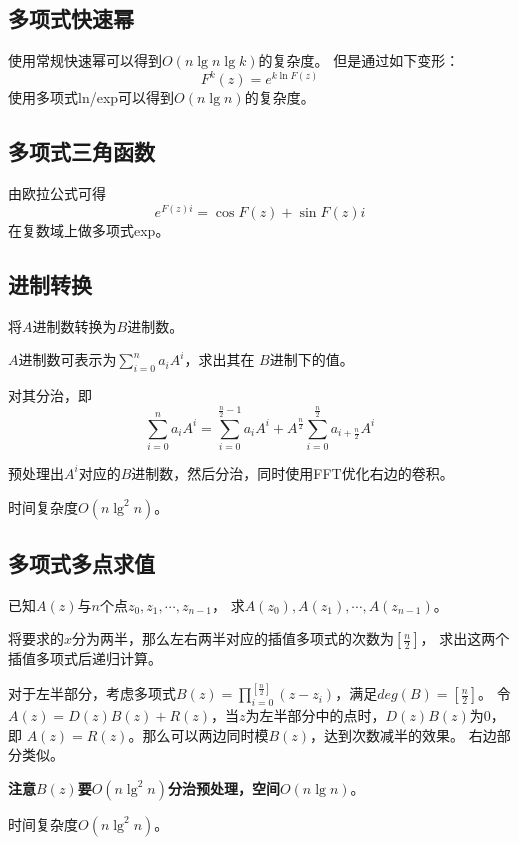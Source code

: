 \subsection{多项式快速幂}
使用常规快速幂可以得到$O(n\lg n\lg k)$的复杂度。
但是通过如下变形：
\begin{displaymath}
    F^k(z)=e^{k \ln F(z)}
\end{displaymath}
使用多项式ln/exp可以得到$O(n\lg n)$的复杂度。
\subsection{多项式三角函数}
由欧拉公式可得
\begin{displaymath}
    e^{F(z)i}=\cos F(z)+\sin F(z) i
\end{displaymath}
在复数域上做多项式exp。
\subsection{进制转换}
将$A$进制数转换为$B$进制数。

$A$进制数可表示为$\displaystyle \sum_{i=0}^n{a_iA^i}$，求出其在
$B$进制下的值。

对其分治，即
\begin{displaymath}
    \sum_{i=0}^n{a_iA^i}=\sum_{i=0}^{\frac{n}{2}-1}{a_iA^i}
    +A^{\frac{n}{2}}\sum_{i=0}^{\frac{n}{2}}{a_{i+\frac{n}{2}}A^i}
\end{displaymath}

预处理出$A^i$对应的$B$进制数，然后分治，同时使用FFT优化右边的卷积。

时间复杂度$O(n \lg^2 n)$。

\subsection{多项式多点求值}
已知$A(z)$与$n$个点$z_0,z_1,\cdots,z_{n-1}$，
求$A(z_0),A(z_1),\cdots,A(z_{n-1})$。

将要求的$x$分为两半，那么左右两半对应的插值多项式的次数为$[\frac{n}{2}]$，
求出这两个插值多项式后递归计算。

对于左半部分，考虑多项式$\displaystyle B(z)=\prod_{i=0}^
{[\frac{n}{2}]}(z-z_i)$，满足$deg(B)=[\frac{n}{2}]$。
令$A(z)=D(z)B(z)+R(z)$，当$z$为左半部分中的点时，$D(z)B(z)$为0，即
$A(z)=R(z)$。那么可以两边同时模$B(z)$，达到次数减半的效果。
右边部分类似。

{\bfseries 注意$B(z)$要$O(n\lg^2 n)$分治预处理，空间$O(n\lg n)$}。

时间复杂度$O(n\lg^2n)$。


